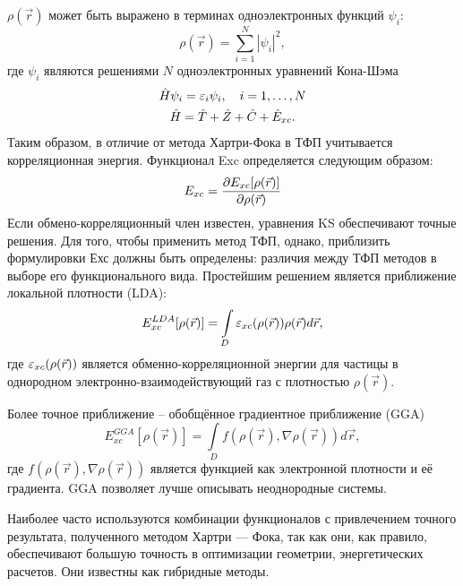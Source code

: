 \( \rho(\vec{r}) \)  может быть выражено в терминах одноэлектронных функций \( \psi_i \):
\begin{equation}
    \rho(\vec{r}) = \sum_{i=1}^N |\psi_i|^2,
\end{equation}
где \(\psi_i\) являются решениями \( N \) одноэлектронных уравнений Кона-Шэма
\begin{gather}
    \hat{H}\psi_i = \varepsilon_i\psi_i,\quad i=1,\ldots,N\\
    \hat{H} = \hat{T} + \hat{Z} + \hat{C} + \hat{E}_{xc}.
\end{gather}
Таким образом, в отличие от метода Хартри-Фока в ТФП учитывается корреляционная энергия. Функционал Exc определяется следующим образом:
\begin{equation}
    E_{xc} = \frac{\partial E_{xc}[\rho(\vec{r})]}{\partial \rho(\vec{r})}
\end{equation}
Если обмено-корреляционный член известен, уравнения KS обеспечивают точные решения. Для того, чтобы применить метод ТФП, однако, приблизить формулировки Ехс должны быть определены: различия между ТФП методов в выборе его функционального вида. Простейшим решением является приближение локальной плотности (LDA):
\begin{equation}
    E_{xc}^{LDA}[\rho(\vec{r})] = \int\limits_{D}\varepsilon_{xc}(\rho(\vec{r}))\rho(\vec{r}) d\vec{r},
\end{equation}
где \(\varepsilon_{xc}(\rho(\vec{r}))\) является обменно-корреляционной энергии для частицы в однородном электронно-взаимодействующий газ с плотностью \(\rho(\vec{r})\).

Более точное приближение -- обобщённое градиентное приближение (GGA)
\begin{equation}
    E_{xc}^{GGA}[\rho(\vec{r})] = \int\limits_{D}f(\rho(\vec{r}), \nabla\rho(\vec{r})) d\vec{r},
\end{equation}
где \( f(\rho(\vec{r}), \nabla\rho(\vec{r})) \) является функцией как электронной плотности и её градиента. GGA позволяет лучше описывать неоднородные системы.

Наиболее часто используются комбинации функционалов с привлечением точного результата, полученного методом Хартри — Фока, так как они, как правило, обеспечивают большую точность в оптимизации геометрии, энергетических расчетов. Они известны как гибридные методы.